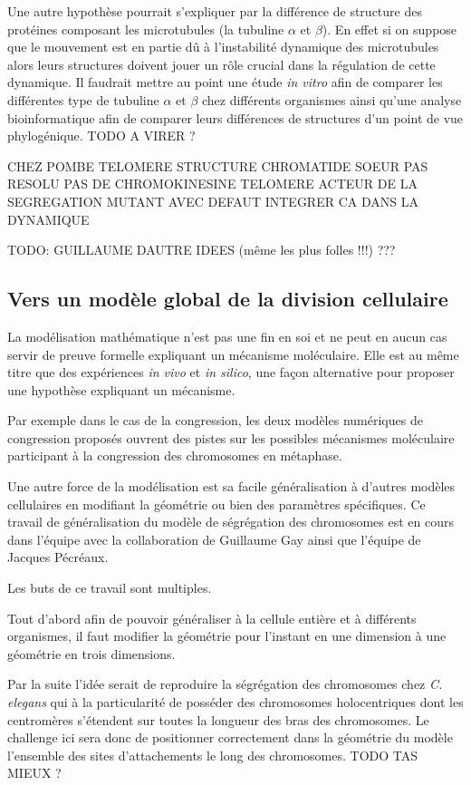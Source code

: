 \documentclass[12pt,a4paper,twoside,openright]{book}
\begin{document}
Une autre hypothèse pourrait s'expliquer par la différence de structure
des protéines composant les microtubules (la tubuline \(\alpha\) et
\(\beta\)). En effet si on suppose que le mouvement est en partie dû à
l'instabilité dynamique des microtubules alors leurs structures doivent
jouer un rôle crucial dans la régulation de cette dynamique. Il faudrait
mettre au point une étude \emph{in vitro} afin de comparer les
différentes type de tubuline \(\alpha\) et \(\beta\) chez différents
organismes ainsi qu'une analyse bioinformatique afin de comparer leurs
différences de structures d'un point de vue phylogénique. TODO A VIRER ?

CHEZ POMBE TELOMERE STRUCTURE CHROMATIDE SOEUR PAS RESOLU PAS DE
CHROMOKINESINE TELOMERE ACTEUR DE LA SEGREGATION MUTANT AVEC DEFAUT
INTEGRER CA DANS LA DYNAMIQUE

TODO: GUILLAUME DAUTRE IDEES (même les plus folles !!!) ???

\subsection{Vers un modèle global de la division
cellulaire}\label{vers-un-moduxe8le-global-de-la-division-cellulaire}

La modélisation mathématique n'est pas une fin en soi et ne peut en
aucun cas servir de preuve formelle expliquant un mécanisme moléculaire.
Elle est au même titre que des expériences \emph{in vivo} et \emph{in
silico}, une façon alternative pour proposer une hypothèse expliquant un
mécanisme.

Par exemple dans le cas de la congression, les deux modèles numériques
de congression proposés ouvrent des pistes sur les possibles mécanismes
moléculaire participant à la congression des chromosomes en métaphase.

Une autre force de la modélisation est sa facile généralisation à
d'autres modèles cellulaires en modifiant la géométrie ou bien des
paramètres spécifiques. Ce travail de généralisation du modèle de
ségrégation des chromosomes est en cours dans l'équipe avec la
collaboration de Guillaume Gay ainsi que l'équipe de Jacques Pécréaux.

Les buts de ce travail sont multiples.

Tout d'abord afin de pouvoir généraliser à la cellule entière et à
différents organismes, il faut modifier la géométrie pour l'instant en
une dimension à une géométrie en trois dimensions.

Par la suite l'idée serait de reproduire la ségrégation des chromosomes
chez \emph{C. elegans} qui à la particularité de posséder des
chromosomes holocentriques dont les centromères s'étendent sur toutes la
longueur des bras des chromosomes. Le challenge ici sera donc de
positionner correctement dans la géométrie du modèle l'ensemble des
sites d'attachements le long des chromosomes. TODO TAS MIEUX ?
\end{document}
